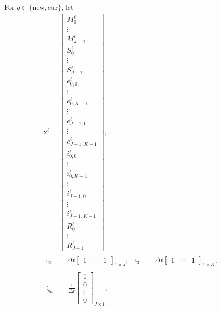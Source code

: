 \documentclass[USenglish]{article}
\renewcommand{\vec}[1]{\boldsymbol{\mathrm{#1}}}
\begin{document}
For $q \in \{\mathrm{new}, \mathrm{cur}\}$, let
\begin{subequations}
  \begin{gather}
    \vec{x}^{\ell} =
    \begin{bmatrix}
      M_0^{\ell} \\ \vdots \\ M_{J - 1}^{\ell} \\
      S_0^{\ell} \\ \vdots \\ S_{J - 1}^{\ell} \\
      e_{0, 0}^{\ell} \\ \vdots \\ e_{0, K - 1}^{\ell} \\ \vdots
      \\ e_{J - 1, 0}^{\ell} \\ \vdots \\ e_{J - 1, K - 1}^{\ell} \\
      i_{0, 0}^{\ell} \\ \vdots \\ i_{0, K - 1}^{\ell} \\ \vdots
      \\ i_{J - 1, 0}^{\ell} \\ \vdots \\ i_{J - 1, K - 1}^{\ell} \\
      R_0^{\ell} \\ \vdots \\ R_{J - 1}^{\ell}
    \end{bmatrix},
    \\
    \begin{aligned}
      \vec{\iota}_a &=
      \Delta t
      \begin{bmatrix}
        1 & \cdots & 1
      \end{bmatrix}_{1 \times J},
      &
      \vec{\iota}_z &=
      \Delta t
      \begin{bmatrix}
        1 & \cdots & 1
      \end{bmatrix}_{1 \times K},
    \end{aligned}
    \\
    \begin{aligned}
      \vec{\zeta}_a &=
      \frac{1}{\Delta t}
      \begin{bmatrix}
        1 \\ 0 \\ \vdots \\ 0
      \end{bmatrix}_{J \times 1},

\end{aligned}
\end{gather}
\end{subequations}
\end{document}
